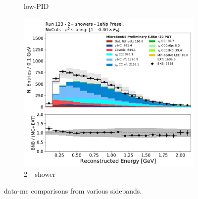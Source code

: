 \begin{figure}[H]
\begin{center}
\begin{subfigure}[b]{0.3\textwidth}
    \caption{\label{fig:datamccomparisons:numu} low-PID \npsel}
    \end{subfigure}
    \begin{subfigure}[b]{0.3\textwidth}
    \centering
    \includegraphics[width=1.00\textwidth]{Sidebands/Figures/1eNp/TwoShower/TwoPShr_NP_None_pi0e040/reco_e.pdf}
    \caption{\label{fig:datamccomparisons:pi0} 2+ shower \zpsel}
    \end{subfigure}
\caption{\label{fig:datamccomparisons2} data-mc comparisons from various sidebands.}
\end{center}
\end{figure}

